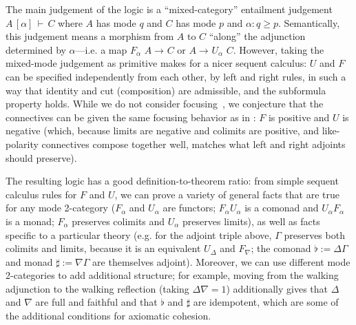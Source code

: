 \documentclass{drl-common/llncs}
\newcommand{\arrow}[3]{\ensuremath{#2 \longrightarrow_{#1} #3}}
\newcommand\F[2]{\ensuremath{F_{#1} \,\, #2}}
\newcommand\U[2]{\ensuremath{U_{#1} \,\, #2}}
\newcommand\seq[3]{\ensuremath{#1 \, [ #2 ] \, \vdash \, #3}}
\begin{document}
The main judgement of the logic is a ``mixed-category'' entailment
judgement \seq{A}{\alpha}{C} where $A$ has mode $q$ and $C$ has mode $p$
and $\alpha : q \ge p$.  Semantically, this judgement means a morphism
from $A$ to $C$ ``along'' the adjunction determined by $\alpha$---i.e. a
map $\arrow{}{\F \alpha A}{C}$ or $\arrow{}{A}{\U \alpha C}$.
However, taking the mixed-mode judgement as
primitive makes for a nicer sequent calculus: $U$ and $F$ can be
specified independently from each other, by left and right rules, in
such a way that identity and cut (composition) are admissible, and the
subformula property holds.  While we do not consider
focusing~\citep{andreoli92focus}, we conjecture that the connectives can
be given the same focusing behavior as in \citep{reed09adjoint}: $F$ is
positive and $U$ is negative (which, because limits are negative and
colimits are positive, and like-polarity connectives compose together
well, matches what left and right adjoints should preserve).

The resulting logic has a good definition-to-theorem ratio: from 
simple sequent calculus rules for $F$ and $U$, we can prove a variety of
general facts that are true for any mode 2-category ($F_\alpha$ and
$U_\alpha$ are functors; $F_\alpha U_\alpha$ is a comonad and $U_\alpha
F_\alpha$ is a monad; $F_\alpha$ preserves colimits and $U_\alpha$
preserves limits), as well as facts specific to a particular theory
(e.g. for the adjoint triple above, $\Gamma$ preserves both colimits
and limits, because it is an equivalent $U_\Delta$ and $F_\nabla$; the
comonad $\flat := \Delta\Gamma$ and monad $\sharp := \nabla\Gamma$ are
themselves adjoint).  Moreover, we can use different mode 2-categories
to add additional structure; for example, moving from the walking
adjunction to the walking reflection (taking $\Delta \nabla = 1$)
additionally gives that $\Delta$ and $\nabla$ are full and faithful and
that $\flat$ and $\sharp$ are idempotent, which are some of the
additional conditions for axiomatic cohesion.
\end{document}
